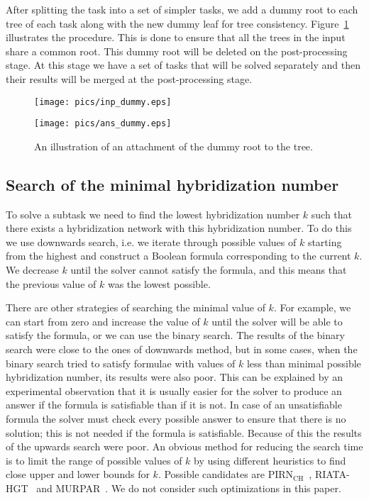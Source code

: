 \documentclass[runningheads, envcountsame, a4paper]{llncs}
\begin{document}
After splitting the task into a set of simpler tasks, we add a dummy root to each tree of each task along with 
the new dummy leaf for tree consistency. Figure~\ref{dummy-example} illustrates the procedure. 
This is done to ensure that all the trees in the input share a common root. 
This dummy root will be deleted on the post-processing stage. At this stage we have a set of tasks that will be solved 
separately and then their results will be merged at the post-processing stage.

\begin{figure}[t]
  \centering
  \begin{minipage}[b]{0.39\linewidth}
    \texttt{[image: pics/inp\_dummy.eps]}
  \end{minipage}
  \hfill
  \begin{minipage}[b]{0.59\linewidth}
    \texttt{[image: pics/ans\_dummy.eps]}
  \end{minipage}
  \caption{An illustration of an attachment of the dummy root to the tree.}
  \label{dummy-example}
\end{figure}

\subsection{Search of the minimal hybridization number}

To solve a subtask we need to find the lowest hybridization number $k$ such that there exists a hybridization 
network with this hybridization number. To do this we use downwards search, i.e. we iterate through possible values of $k$ starting from the highest 
and construct a Boolean formula corresponding to the current $k$. 
We decrease $k$ until the solver cannot satisfy the formula, and this means that the previous value of $k$ was the 
lowest possible.

There are other strategies of searching the minimal value of $k$. For example, we can start from 
zero and increase the value of $k$ until the solver will be able to satisfy the formula, or we can use the binary search. 
The results of the binary search were close to the ones of downwards method, 
but in some cases, when the binary search tried to satisfy formulae with values of $k$ less than minimal possible hybridization number, 
its results were also poor. 
This can be explained by an experimental observation that it is usually easier for the solver to produce an answer if the formula is satisfiable than if it is not. 
In case of an unsatisfiable formula the solver must check every possible answer to ensure that there is no solution; this is not needed if the 
formula is satisfiable. Because of this the results of the upwards search were poor. An obvious method 
for reducing the search time is to limit the range of possible values of $k$ by using different heuristics to find close upper and lower bounds for $k$. 
Possible candidates are PIRN$\mathrm{_{CH}}$~\cite{wu2013algorithm}, RIATA-HGT~\cite{nakhleh2005riata} and MURPAR~\cite{park2012murpar}. We do not consider such optimizations in this paper.
\end{document}
